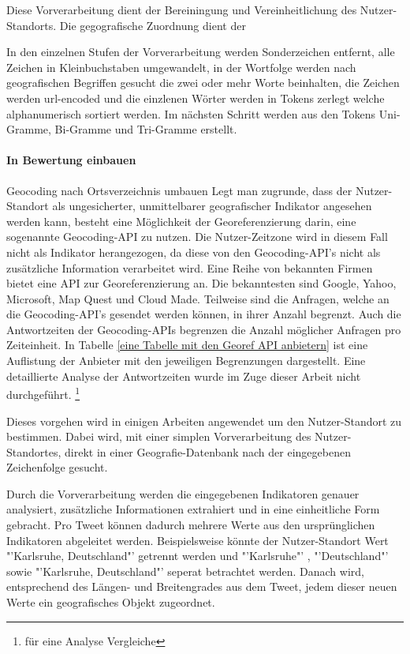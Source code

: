 	Diese Vorverarbeitung dient der Bereiningung und Vereinheitlichung des Nutzer-Standorts.  
	Die gegografische Zuordnung dient der  

	In den einzelnen Stufen der Vorverarbeitung werden Sonderzeichen entfernt, alle Zeichen in Kleinbuchstaben umgewandelt, in der Wortfolge werden nach geografischen Begriffen gesucht die zwei oder mehr Worte beinhalten, die Zeichen werden url-encoded und die einzlenen Wörter werden in Tokens zerlegt welche alphanumerisch sortiert werden.
	Im nächsten Schritt werden aus den Tokens Uni-Gramme, Bi-Gramme und Tri-Gramme erstellt. 



	\paragraph{In Bewertung einbauen} 
	Geocoding nach Ortsverzeichnis umbauen
	Legt man zugrunde, dass der Nutzer-Standort als ungesicherter, unmittelbarer geografischer Indikator angesehen werden kann, besteht eine Möglichkeit der Georeferenzierung darin, eine sogenannte Geocoding-API zu nutzen.
	Die Nutzer-Zeitzone wird in diesem Fall nicht als Indikator herangezogen, da diese von den Geocoding-API's nicht als zusätzliche Information verarbeitet wird. 
	Eine Reihe von bekannten Firmen bietet eine API zur Georeferenzierung an. 
	Die bekanntesten sind Google, Yahoo, Microsoft, Map Quest und Cloud Made. 
	Teilweise sind die Anfragen, welche an die Geocoding-API's gesendet werden können, in ihrer Anzahl begrenzt.
	Auch die Antwortzeiten der Geocoding-APIs begrenzen die Anzahl möglicher Anfragen pro Zeiteinheit. 
	In Tabelle \ref{eine Tabelle mit den Georef API anbietern} ist eine Auflistung der Anbieter mit den jeweiligen Begrenzungen dargestellt.
	Eine detaillierte Analyse der Antwortzeiten wurde im Zuge dieser Arbeit nicht durchgeführt.  \footnote{für eine Analyse Vergleiche} 


	
	Dieses vorgehen wird in einigen Arbeiten angewendet um den Nutzer-Standort zu bestimmen. 
	Dabei wird, mit einer simplen Vorverarbeitung des Nutzer-Standortes, direkt in einer Geografie-Datenbank nach der eingegebenen Zeichenfolge gesucht. 

	Durch die Vorverarbeitung werden die eingegebenen Indikatoren genauer analysiert, zusätzliche Informationen extrahiert und in eine einheitliche Form gebracht.
	Pro Tweet können dadurch mehrere Werte aus den ursprünglichen Indikatoren abgeleitet werden.
	Beispielsweise könnte der Nutzer-Standort Wert "'Karlsruhe, Deutschland"' getrennt werden und "'Karlsruhe"' , "'Deutschland"' sowie "'Karlsruhe, Deutschland"' seperat betrachtet werden.  
	Danach wird, entsprechend des Längen- und Breitengrades aus dem Tweet, jedem dieser neuen Werte ein geografisches Objekt zugeordnet.

